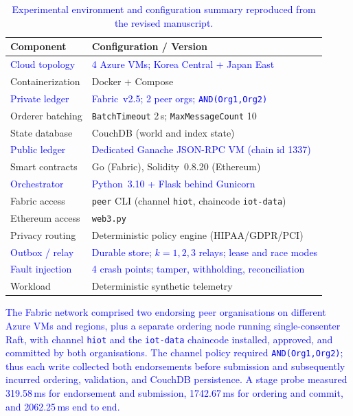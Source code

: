 \documentclass[11pt]{article}
\newcounter{reviewer}
\newcounter{point}[reviewer]
\begin{document}
\begin{table}[!htbp]
\centering
\caption{\textcolor{blue}{Experimental environment and configuration summary reproduced from the revised manuscript.}}
\label{tab:env}
\renewcommand{\arraystretch}{1.05}
\setlength{\tabcolsep}{4pt}
\scriptsize
\begin{tabular}{@{}p{}p{}@{}}
\toprule
\textbf{Component} & \textbf{Configuration / Version} \\ \midrule
\textcolor{blue}{Cloud topology} & \textcolor{blue}{4 Azure VMs; Korea Central + Japan East} \\
Containerization & Docker + Compose \\
\textcolor{blue}{Private ledger} & \textcolor{blue}{Fabric~v2.5; 2 peer orgs; \texttt{AND(Org1,Org2)}} \\
Orderer batching & \texttt{BatchTimeout} 2\,s; \texttt{MaxMessageCount} 10 \\
State database & CouchDB (world and index state) \\
\textcolor{blue}{Public ledger} & \textcolor{blue}{Dedicated Ganache JSON-RPC VM (chain id 1337)} \\
Smart contracts & Go (Fabric), Solidity~0.8.20 (Ethereum) \\
\textcolor{blue}{Orchestrator} & \textcolor{blue}{Python~3.10 + Flask behind Gunicorn} \\
Fabric access & \texttt{peer} CLI (channel \texttt{hiot}, chaincode \texttt{iot-data}) \\
Ethereum access & \texttt{web3.py} \\
Privacy routing & Deterministic policy engine (HIPAA/GDPR/PCI) \\
\textcolor{blue}{Outbox / relay} & \textcolor{blue}{Durable store; $k=1,2,3$ relays; lease and race modes} \\
\textcolor{blue}{Fault injection} & \textcolor{blue}{4 crash points; tamper, withholding, reconciliation} \\
Workload & Deterministic synthetic telemetry \\
\bottomrule
\end{tabular}
\end{table}

\textcolor{blue}{The Fabric network comprised two endorsing peer organisations on different Azure VMs and regions, plus a separate ordering node running single-consenter Raft, with channel \texttt{hiot} and the \texttt{iot-data} chaincode installed, approved, and committed by both organisations. The channel policy required \texttt{AND(Org1,Org2)}; thus each write collected both endorsements before submission and subsequently incurred ordering, validation, and CouchDB persistence. A stage probe measured 319.58\,ms for endorsement and submission, 1742.67\,ms for ordering and commit, and 2062.25\,ms end to end.}
\end{document}
